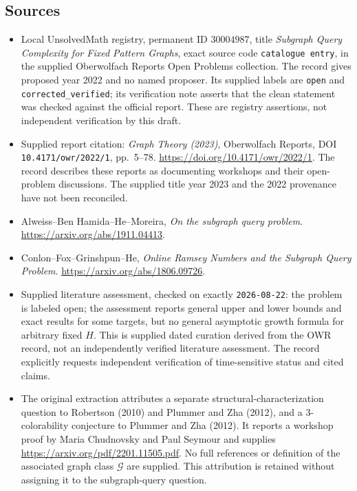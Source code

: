 \documentclass[11pt]{article}
\begin{document}
\subsection{Sources}
\begin{itemize}
\item Local UnsolvedMath registry, permanent ID \(30004987\), title \emph{Subgraph Query Complexity for Fixed Pattern Graphs}, exact source code \texttt{catalogue entry}, in the supplied Oberwolfach Reports Open Problems collection. The record gives proposed year 2022 and no named proposer. Its supplied labels are \texttt{open} and \texttt{corrected\_verified}; its verification note asserts that the clean statement was checked against the official report. These are registry assertions, not independent verification by this draft.
\item Supplied report citation: \emph{Graph Theory (2023)}, Oberwolfach Reports, DOI \texttt{10.4171/owr/2022/1}, pp.\ 5--78. \url{https://doi.org/10.4171/owr/2022/1}. The record describes these reports as documenting workshops and their open-problem discussions. The supplied title year 2023 and the 2022 provenance have not been reconciled.
\item Alweiss--Ben Hamida--He--Moreira, \emph{On the subgraph query problem}. \url{https://arxiv.org/abs/1911.04413}.
\item Conlon--Fox--Grinshpun--He, \emph{Online Ramsey Numbers and the Subgraph Query Problem}. \url{https://arxiv.org/abs/1806.09726}.
\item Supplied literature assessment, checked on exactly \texttt{2026-08-22}: the problem is labeled open; the assessment reports general upper and lower bounds and exact results for some targets, but no general asymptotic growth formula for arbitrary fixed \(H\). This is supplied dated curation derived from the OWR record, not an independently verified literature assessment. The record explicitly requests independent verification of time-sensitive status and cited claims.
\item The original extraction attributes a separate structural-characterization question to Robertson (2010) and Plummer and Zha (2012), and a \(3\)-colorability conjecture to Plummer and Zha (2012). It reports a workshop proof by Maria Chudnovsky and Paul Seymour and supplies \url{https://arxiv.org/pdf/2201.11505.pdf}. No full references or definition of the associated graph class \(\mathcal G\) are supplied. This attribution is retained without assigning it to the subgraph-query question.
\end{itemize}
\end{document}
